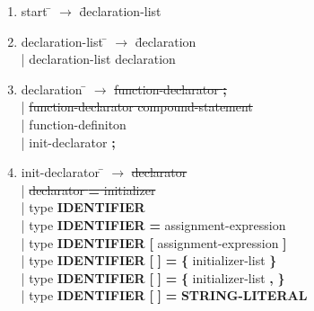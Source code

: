 \small
\begin{enumerate}
\item \begin{tabbing} start \= $\rightarrow$ \= declaration-list \\
\end{tabbing}

\item \begin{tabbing} declaration-list \= $\rightarrow$ \= declaration \\
	\> \hspace*{0.05cm} | \> declaration-list declaration \\
\end{tabbing}

\item \begin{tabbing} declaration \= $\rightarrow$ \= \sout{function-declarator \textbf{;}} \\
	\> \hspace*{0.05cm} | \> \sout{function-declarator compound-statement} \\
	\> \hspace*{0.05cm} | \> function-definiton \\
	\> \hspace*{0.05cm} | \> init-declarator \textbf{;} \\
\end{tabbing}

\item \begin{tabbing} init-declarator \= $\rightarrow$ \= \sout{declarator} \\
	\> \hspace*{0.05cm} | \> \sout{declarator \textbf{=} initializer} \\
	\> \hspace*{0.05cm} | \> type \textbf{IDENTIFIER}                                                                                                 \\
	\> \hspace*{0.05cm} | \> type \textbf{IDENTIFIER} \textbf{=} assignment-expression                                                              \\
	\> \hspace*{0.05cm} | \> type \textbf{IDENTIFIER} \textbf{[} assignment-expression \textbf{]}                                                 \\
	\> \hspace*{0.05cm} | \> type \textbf{IDENTIFIER} \textbf{[} \textbf{]} \textbf{=} \textbf{\{} initializer-list \textbf{\}}               \\
	\> \hspace*{0.05cm} | \> type \textbf{IDENTIFIER} \textbf{[} \textbf{]} \textbf{=} \textbf{\{} initializer-list \textbf{,} \textbf{\}}  \\
	\> \hspace*{0.05cm} | \> type \textbf{IDENTIFIER} \textbf{[} \textbf{]} \textbf{=} \textbf{STRING-LITERAL}                                  \\
\end{tabbing}



\end{enumerate}
